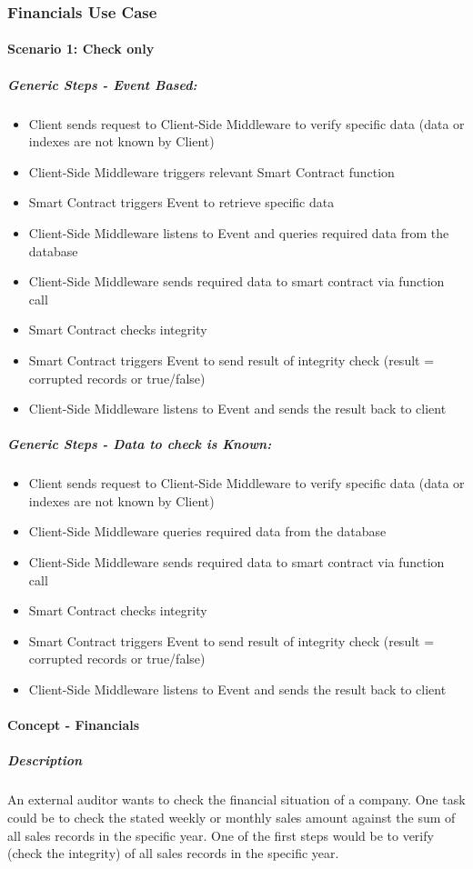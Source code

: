 \subsubsection{Financials Use Case}
\paragraph{Scenario 1: Check only}
\subparagraph{Generic Steps - Event Based:}
\begin{itemize}
\item Client sends request to Client-Side Middleware to verify specific data (data or indexes are not known by Client)
\item Client-Side Middleware triggers relevant Smart Contract function
\item Smart Contract triggers Event to retrieve specific data
\item Client-Side Middleware listens to Event and queries required data from the database
\item Client-Side Middleware sends required data to smart contract via function call
\item Smart Contract checks integrity
\item Smart Contract triggers Event to send result of integrity check (result = corrupted records or true/false)
\item Client-Side Middleware listens to Event and sends the result back to client
\end{itemize}

\subparagraph{Generic Steps - Data to check is Known:}
\begin{itemize}
\item Client sends request to Client-Side Middleware to verify specific data (data or indexes are not known by Client)
\item Client-Side Middleware queries required data from the database
\item Client-Side Middleware sends required data to smart contract via function call
\item Smart Contract checks integrity
\item Smart Contract triggers Event to send result of integrity check (result = corrupted records or true/false)
\item Client-Side Middleware listens to Event and sends the result back to client
\end{itemize}

\paragraph{Concept - Financials}
\subparagraph{Description}
An external auditor wants to check the financial situation of a company. One task could be to check the stated weekly or monthly sales amount against the sum of all sales records in the specific year. One of the first steps would be to verify (check the integrity) of all sales records in the specific year.

